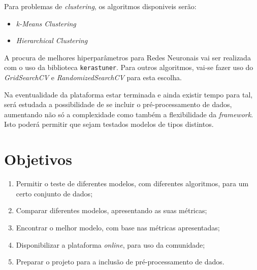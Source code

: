 \documentclass[a4paper]{article}
\begin{document}
{    Para problemas de \textit{clustering}, os algoritmos disponiveis serão:
    \begin{itemize}
        \item \textit{k-Means Clustering}
        \item \textit{Hierarchical Clustering}
    \end{itemize}
    
    A procura de melhores hiperparâmetros para Redes Neuronais vai ser realizada com o uso da biblioteca \texttt{kerastuner}. 
    Para outros algoritmos, vai-se fazer uso do \textit{GridSearchCV} e \textit{RandomizedSearchCV} para esta escolha.

    Na eventualidade da plataforma estar terminada e ainda existir tempo para tal, será estudada a possibilidade de se incluir o pré-processamento de dados, 
    aumentando não só a complexidade como também a flexibilidade da \textit{framework}. Isto poderá permitir que sejam testados modelos de tipos distintos.
}

\section{Objetivos}
\normalsize{
    \begin{enumerate}
        \item Permitir o teste de diferentes modelos, com diferentes algoritmos, para um certo conjunto de dados;
        \item Comparar diferentes modelos, apresentando as suas métricas;
        \item Encontrar o melhor modelo, com base nas métricas apresentadas;
        \item Disponibilizar a plataforma \textit{online}, para uso da comunidade;
        \item Preparar o projeto para a inclusão de pré-processamento de dados.
    \end{enumerate}
}
\end{document}
